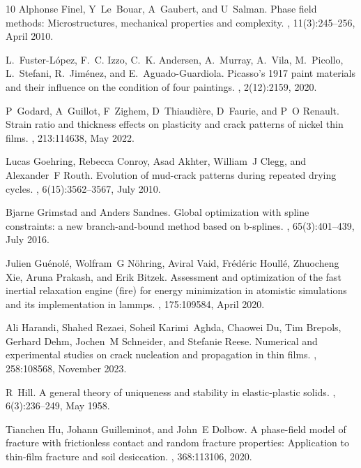 \documentclass[10pt]{article}
\begin{document}
\begin{thebibliography}{10}
    Alphonse Finel, Y~Le~Bouar, A~Gaubert, and U~Salman.
    \newblock Phase field methods: Microstructures, mechanical properties and complexity.
    , 11(3):245--256, April 2010.

    L.~Fuster-L{\'o}pez, F.~C. Izzo, C.~K. Andersen, A.~Murray, A.~Vila, M.~Picollo, L.~Stefani, R.~Jim{\'e}nez, and E.~Aguado-Guardiola.
    \newblock Picasso's 1917 paint materials and their influence on the condition of four paintings.
    , 2(12):2159, 2020.

    P~Godard, A~Guillot, F~Zighem, D~Thiaudi{\`e}re, D~Faurie, and P~O Renault.
    \newblock Strain ratio and thickness effects on plasticity and crack patterns of nickel thin films.
    , 213:114638, May 2022.

    Lucas Goehring, Rebecca Conroy, Asad Akhter, William~J Clegg, and Alexander~F Routh.
    \newblock Evolution of mud-crack patterns during repeated drying cycles.
    , 6(15):3562--3567, July 2010.

    Bjarne Grimstad and Anders Sandnes.
    \newblock Global optimization with spline constraints: a new branch-and-bound method based on b-splines.
    , 65(3):401--439, July 2016.

    Julien Gu{\'e}nol{\'e}, Wolfram~G N{\"o}hring, Aviral Vaid, Fr{\'e}d{\'e}ric Houll{\'e}, Zhuocheng Xie, Aruna Prakash, and Erik Bitzek.
    \newblock Assessment and optimization of the fast inertial relaxation engine (fire) for energy minimization in atomistic simulations and its implementation in lammps.
    , 175:109584, April 2020.

    Ali Harandi, Shahed Rezaei, Soheil Karimi~Aghda, Chaowei Du, Tim Brepols, Gerhard Dehm, Jochen~M Schneider, and Stefanie Reese.
    \newblock Numerical and experimental studies on crack nucleation and propagation in thin films.
    , 258:108568, November 2023.

    R~Hill.
    \newblock A general theory of uniqueness and stability in elastic-plastic solids.
    , 6(3):236--249, May 1958.

    Tianchen Hu, Johann Guilleminot, and John~E Dolbow.
    \newblock A phase-field model of fracture with frictionless contact and random fracture properties: Application to thin-film fracture and soil desiccation.
    , 368:113106, 2020.


\end{thebibliography}
\end{document}
